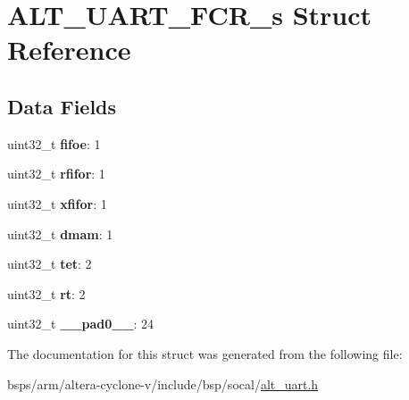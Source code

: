 \hypertarget{structALT__UART__FCR__s}{}\section{A\+L\+T\+\_\+\+U\+A\+R\+T\+\_\+\+F\+C\+R\+\_\+s Struct Reference}
\label{structALT__UART__FCR__s}
\subsection*{Data Fields}
\begin{DoxyCompactItemize}
\item 
\mbox{\label{structALT__UART__FCR__s_a78ea173b836127961e1b4ee19918fdcb}} 
uint32\+\_\+t {\bfseries fifoe}\+: 1
\item 
\mbox{\label{structALT__UART__FCR__s_aaca224fc10181e1e9cdd6579bf8bf129}} 
uint32\+\_\+t {\bfseries rfifor}\+: 1
\item 
\mbox{\label{structALT__UART__FCR__s_a6fb476c33179d618cfd90b2c61e6fb95}} 
uint32\+\_\+t {\bfseries xfifor}\+: 1
\item 
\mbox{\label{structALT__UART__FCR__s_a3f1afbc4a086f91fbd4b663deb597b67}} 
uint32\+\_\+t {\bfseries dmam}\+: 1
\item 
\mbox{\label{structALT__UART__FCR__s_a99884fbecb5f35ceab5b0fd5215df525}} 
uint32\+\_\+t {\bfseries tet}\+: 2
\item 
\mbox{\label{structALT__UART__FCR__s_a3768af03f39817a5a467a6d9d161deba}} 
uint32\+\_\+t {\bfseries rt}\+: 2
\item 
\mbox{\label{structALT__UART__FCR__s_acc9bba7c04cf7e6049e8e12b23796d61}} 
uint32\+\_\+t {\bfseries \+\_\+\+\_\+pad0\+\_\+\+\_\+}\+: 24
\end{DoxyCompactItemize}


The documentation for this struct was generated from the following file\+:\begin{DoxyCompactItemize}
\item 
bsps/arm/altera-\/cyclone-\/v/include/bsp/socal/\mbox{\hyperlink{alt__uart_8h}{alt\+\_\+uart.\+h}}\end{DoxyCompactItemize}
